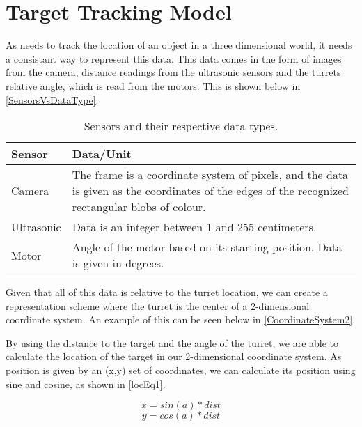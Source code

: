 \section{Target Tracking Model}\label{RepScheme}
As \name needs to track the location of an object in a three dimensional world,
it needs a consistant way to represent this data. This data comes in the form
of images from the camera, distance readings from the ultrasonic sensors and
the turrets relative angle, which is read from the motors. This is shown
below in \autoref{SensorsVsDataType}.

\begin{table}[H]
\centering
\begin{tabular}{|p{2cm}|p{12cm}|}
\hline
Sensor     & Data/Unit                                                                                                                                        \\ \hline
Camera     & The frame is a coordinate system of pixels, and the data is given as the coordinates of the edges of the recognized rectangular blobs of colour. \\ \hline
Ultrasonic & Data is an integer between 1 and 255 centimeters.                                                                                                \\ \hline
Motor      & Angle of the motor based on its starting position. Data is given in degrees.                                                                     \\ \hline
\end{tabular}
\caption{Sensors and their respective data types.}
\label{SensorsVsDataType}
\end{table}

Given that all of this data is relative to the turret location, we can create a
representation scheme where the turret is the center of a 2-dimensional
coordinate system. An example of this can be seen below in
\autoref{CoordinateSystem2}.\nl

By using the distance to the target and the angle of the turret, we are able to
calculate the location of the target in our 2-dimensional coordinate system.
As position is given by an (x,y) set of coordinates, we can calculate its
position using sine and cosine, as shown in \autoref{locEq1}.

\begin{equation}\label{locEq1}
x=sin(a)*dist
\end{equation}
\begin{equation}\label{locEq2}
y=cos(a)*dist
\end{equation} 

